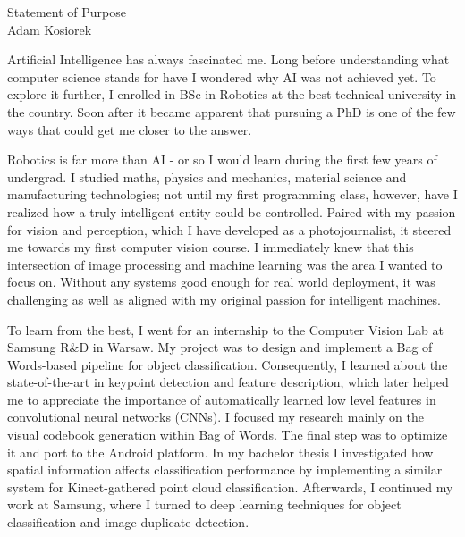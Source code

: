 \documentclass[12pt]{article}
\begin{document}
\begin{center}
{\Large Statement of Purpose} \\[.3in]
{\large Adam Kosiorek}
\end{center}

\vspace*{.5in}

Artificial Intelligence has always fascinated me. Long before understanding what computer science stands for have I wondered why AI was not achieved yet. To explore it further, I enrolled in BSc in Robotics at the best technical university in the country. Soon after it became apparent that pursuing a PhD is one of the few ways that could get me closer to the answer.

Robotics is far more than AI - or so I would learn during the first few years of undergrad. I studied maths, physics and mechanics, material science and manufacturing technologies; not until my first programming class, however, have I realized how a truly intelligent entity could be controlled. Paired with my passion for vision and perception, which I have developed as a photojournalist, it steered me towards my first computer vision course. I immediately knew that this intersection of image processing and machine learning was the area I wanted to focus on. Without any systems good enough for real world deployment, it was challenging as well as aligned with my original passion for intelligent machines. 

To learn from the best, I went for an internship to the Computer Vision Lab at Samsung R\&D in Warsaw. My project was to design and implement a Bag of Words-based pipeline for object classification. Consequently, I learned about the state-of-the-art in keypoint detection and feature description, which later helped me to appreciate the importance of automatically learned low level features in convolutional neural networks (CNNs). I focused my research mainly on the visual codebook generation within Bag of Words. The final step was to optimize it and port to the Android platform. In my bachelor thesis I investigated how spatial information affects classification performance by implementing a similar system for Kinect-gathered point cloud classification. Afterwards, I continued my work at Samsung, where I turned to deep learning techniques for object classification and image duplicate detection.
\end{document}
